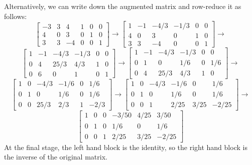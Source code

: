 \documentclass{amsart}
\newcommand{\xra}{\xrightarrow}
\renewcommand{\:}       {\colon}
\begin{document}
\begin{enumerate}
  Alternatively, we can write down the augmented matrix and row-reduce
  it as follows:
  \[ \left[\begin{array}{ccc|ccc}
      -3 & 3 &  4 & 1 & 0 & 0 \\ 
       4 & 0 &  3 & 0 & 1 & 0 \\ 
       3 & 3 & -4 & 0 & 0 & 1 
     \end{array}\right] \xra{}
     \left[\begin{array}{ccc|ccc}
         1 &  -1 & -4/3 & -1/3 &    0 &    0 \\ 
         4 &   0 &    3 &    0 &    1 &    0 \\ 
         3 &   3 &   -4 &    0 &    0 &    1 
     \end{array}\right] \xra{}
   \] \[
     \left[\begin{array}{ccc|ccc}
         1 &  -1 & -4/3 & -1/3 &    0 &    0 \\ 
         0 &   4 & 25/3 &  4/3 &    1 &    0 \\ 
         0 &   6 &    0 &    1 &    0 &    1 
     \end{array}\right] \xra{}
     \left[\begin{array}{ccc|ccc}
         1 &  -1 & -4/3 & -1/3 &    0 &    0 \\ 
         0 &   1 &    0 &  1/6 &    0 &  1/6 \\
         0 &   4 & 25/3 &  4/3 &    1 &    0 
     \end{array}\right] \xra{}
   \] \[
     \left[\begin{array}{ccc|ccc}
         1 &   0 & -4/3 & -1/6 &    0 &  1/6 \\ 
         0 &   1 &    0 &  1/6 &    0 &  1/6 \\
         0 &   0 & 25/3 &  2/3 &    1 & -2/3
     \end{array}\right] \xra{}
     \left[\begin{array}{ccc|ccc}
         1 &   0 & -4/3 & -1/6 &    0 &  1/6 \\ 
         0 &   1 &    0 &  1/6 &    0 &  1/6 \\
         0 &   0 &    1 & 2/25 & 3/25 & -2/25
     \end{array}\right] \xra{}
   \] \[
     \left[\begin{array}{ccc|ccc}
         1 &   0 &    0 & -3/50& 4/25 & 3/50 \\ 
         0 &   1 &    0 &  1/6 &    0 &  1/6 \\
         0 &   0 &    1 & 2/25 & 3/25 & -2/25
     \end{array}\right] 
  \]
  At the final stage, the left hand block is the identity, so
  the right hand block is the inverse of the original matrix.

\end{enumerate}
\end{document}
